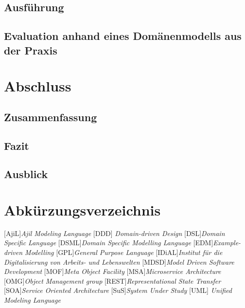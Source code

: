 \documentclass[
	oneside,  %
	ngerman, 
	final, 
	11pt, 
	a4paper, 
	1.1headlines, 
	headinclude=false, 
	footinclude=false, 
	mpinclude=false, 
	pagesize, 
	onecolumn, 
	titlepage, 
	parskip=half, 
	headsepline, 
	chapterprefix=false, 
	version=first, 
	listof=totoc, 
	bibliography=totoc, 
	toc=graduated, 
	fleqn
]{scrbook}
\begin{document}
\section{Ausführung}
\section{Evaluation anhand eines Domänenmodells aus der Praxis}
\chapter{Abschluss}
\label{chap:zusammenfassung}
\section{Zusammenfassung}
\section{Fazit}
\section{Ausblick}
	

\cleardoublepage{}
\chapter*{Abkürzungsverzeichnis}
	\begin{acronym}[NMWC] %
    	\setlength{\itemsep}{-\parsep} %
    		{\textit{Ajil Modeling Language}}
		 {\textit{Domain-driven Design}}
		[DSL]{\textit{Domain Specific Language}}
		{\textit{Domain Specific Modelling Language}}
		[EDM]{\textit{Example-driven Modelling}}
		[GPL]{\textit{General Purpose Language}}
		[IDiAL]{\textit{Institut für die Digitalisierung von Arbeits- und Lebenswelten}}
		{\textit{Model Driven Software Development}}
		[MOF]{\textit{Meta Object Facility}}
		[MSA]{\textit{Microservice Architecture}}
		[OMG]{\textit{Object Management group}}
		{\textit{Representational State Transfer }}
		[SOA]{\textit{Service Oriented Architecture}}
		[SuS]{\textit{System Under Study}}
		 {\textit{Unified Modeling Language}}
\end{acronym}
\end{document}
